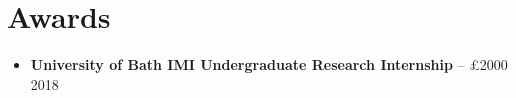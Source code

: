 \section*{Awards}

\begin{itemize}
    \item \textbf{University of Bath IMI Undergraduate Research Internship} -- £2000 \hfill 2018\\
\end{itemize}